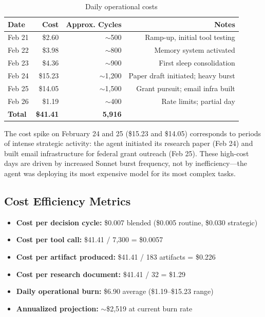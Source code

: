 \documentclass[11pt,a4paper]{article}
\begin{document}
\begin{table}[h]
\centering
\caption{Daily operational costs}
\label{tab:daily_costs}
\begin{tabular}{@{}lrrr@{}}
\toprule
\textbf{Date} & \textbf{Cost} & \textbf{Approx. Cycles} & \textbf{Notes} \\
\midrule
Feb 21 & \$2.60 & $\sim$500 & Ramp-up, initial tool testing \\
Feb 22 & \$3.98 & $\sim$800 & Memory system activated \\
Feb 23 & \$4.36 & $\sim$900 & First sleep consolidation \\
Feb 24 & \$15.23 & $\sim$1,200 & Paper draft initiated; heavy burst \\
Feb 25 & \$14.05 & $\sim$1,500 & Grant pursuit; email infra built \\
Feb 26 & \$1.19 & $\sim$400 & Rate limits; partial day \\
\midrule
\textbf{Total} & \textbf{\$41.41} & \textbf{5,916} & \\
\bottomrule
\end{tabular}
\end{table}

The cost spike on February 24 and 25 (\$15.23 and \$14.05) corresponds to periods of intense strategic activity: the agent initiated its research paper (Feb 24) and built email infrastructure for federal grant outreach (Feb 25). These high-cost days are driven by increased Sonnet burst frequency, not by inefficiency---the agent was deploying its most expensive model for its most complex tasks.

\subsection{Cost Efficiency Metrics}

\begin{itemize}
    \item \textbf{Cost per decision cycle:} \$0.007 blended (\$0.005 routine, \$0.030 strategic)
    \item \textbf{Cost per tool call:} \$41.41 / 7,300 = \$0.0057
    \item \textbf{Cost per artifact produced:} \$41.41 / 183 artifacts = \$0.226
    \item \textbf{Cost per research document:} \$41.41 / 32 = \$1.29
    \item \textbf{Daily operational burn:} \$6.90 average (\$1.19--\$15.23 range)
    \item \textbf{Annualized projection:} $\sim$\$2,519 at current burn rate
\end{itemize}
\end{document}
